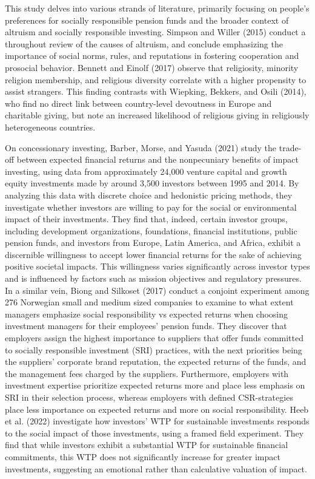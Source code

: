 \documentclass[
  12pt,
]{article}
\begin{document}
This study delves into various strands of literature, primarily focusing on people's preferences for socially responsible pension funds and the broader context of altruism and socially responsible investing. Simpson and Willer (2015) conduct a throughout review of the causes of altruism, and conclude emphasizing the importance of social norms, rules, and reputations in fostering cooperation and prosocial behavior. Bennett and Einolf (2017) observe that religiosity, minority religion membership, and religious diversity correlate with a higher propensity to assist strangers. This finding contrasts with Wiepking, Bekkers, and Osili (2014), who find no direct link between country-level devoutness in Europe and charitable giving, but note an increased likelihood of religious giving in religiously heterogeneous countries.

On concessionary investing, Barber, Morse, and Yasuda (2021) study the trade-off between expected financial returns and the nonpecuniary benefits of impact investing, using data from approximately 24,000 venture capital and growth equity investments made by around 3,500 investors between 1995 and 2014. By analyzing this data with discrete choice and hedonistic pricing methods, they investigate whether investors are willing to pay for the social or environmental impact of their investments. They find that, indeed, certain investor groups, including development organizations, foundations, financial institutions, public pension funds, and investors from Europe, Latin America, and Africa, exhibit a discernible willingness to accept lower financial returns for the sake of achieving positive societal impacts. This willingness varies significantly across investor types and is influenced by factors such as mission objectives and regulatory pressures. In a similar vein, Biong and Silkoset (2017) conduct a conjoint experiment among 276 Norwegian small and medium sized companies to examine to what extent managers emphasize social responsibility vs expected returns when choosing investment managers for their employees' pension funds. They discover that employers assign the highest importance to suppliers that offer funds committed to socially responsible investment (SRI) practices, with the next priorities being the suppliers' corporate brand reputation, the expected returns of the funds, and the management fees charged by the suppliers. Furthermore, employers with investment expertise prioritize expected returns more and place less emphasis on SRI in their selection process, whereas employers with defined CSR-strategies place less importance on expected returns and more on social responsibility. Heeb et al. (2022) investigate how investors' WTP for sustainable investments responds to the social impact of those investments, using a framed field experiment. They find that while investors exhibit a substantial WTP for sustainable financial commitments, this WTP does not significantly increase for greater impact investments, suggesting an emotional rather than calculative valuation of impact.
\end{document}
